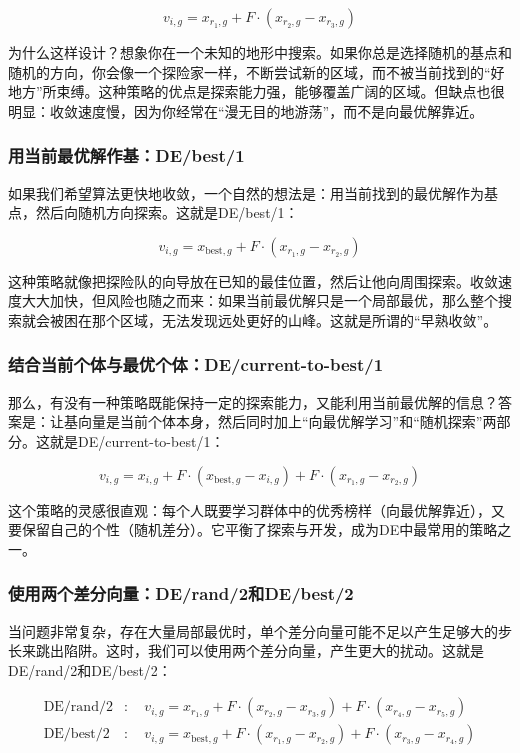 \documentclass[lang=cn,zihao=-4,a4paper,fontset=windows]{beautybook}
\begin{document}
\[
v_{i,g} = x_{r_1,g} + F \cdot (x_{r_2,g} - x_{r_3,g})
\]

为什么这样设计？想象你在一个未知的地形中搜索。如果你总是选择随机的基点和随机的方向，你会像一个探险家一样，不断尝试新的区域，而不被当前找到的“好地方”所束缚。这种策略的优点是探索能力强，能够覆盖广阔的区域。但缺点也很明显：收敛速度慢，因为你经常在“漫无目的地游荡”，而不是向最优解靠近。

\subsubsection{用当前最优解作基：DE/best/1}

如果我们希望算法更快地收敛，一个自然的想法是：用当前找到的最优解作为基点，然后向随机方向探索。这就是DE/best/1：

\[
v_{i,g} = x_{\text{best},g} + F \cdot (x_{r_1,g} - x_{r_2,g})
\]

这种策略就像把探险队的向导放在已知的最佳位置，然后让他向周围探索。收敛速度大大加快，但风险也随之而来：如果当前最优解只是一个局部最优，那么整个搜索就会被困在那个区域，无法发现远处更好的山峰。这就是所谓的“早熟收敛”。

\subsubsection{结合当前个体与最优个体：DE/current-to-best/1}

那么，有没有一种策略既能保持一定的探索能力，又能利用当前最优解的信息？答案是：让基向量是当前个体本身，然后同时加上“向最优解学习”和“随机探索”两部分。这就是DE/current-to-best/1：

\[
v_{i,g} = x_{i,g} + F \cdot (x_{\text{best},g} - x_{i,g}) + F \cdot (x_{r_1,g} - x_{r_2,g})
\]

这个策略的灵感很直观：每个人既要学习群体中的优秀榜样（向最优解靠近），又要保留自己的个性（随机差分）。它平衡了探索与开发，成为DE中最常用的策略之一。

\subsubsection{使用两个差分向量：DE/rand/2和DE/best/2}

当问题非常复杂，存在大量局部最优时，单个差分向量可能不足以产生足够大的步长来跳出陷阱。这时，我们可以使用两个差分向量，产生更大的扰动。这就是DE/rand/2和DE/best/2：

\[
\begin{aligned}
\text{DE/rand/2}&:\quad v_{i,g} = x_{r_1,g} + F \cdot (x_{r_2,g} - x_{r_3,g}) + F \cdot (x_{r_4,g} - x_{r_5,g}) \\
\text{DE/best/2}&:\quad v_{i,g} = x_{\text{best},g} + F \cdot (x_{r_1,g} - x_{r_2,g}) + F \cdot (x_{r_3,g} - x_{r_4,g})
\end{aligned}
\]
\end{document}
